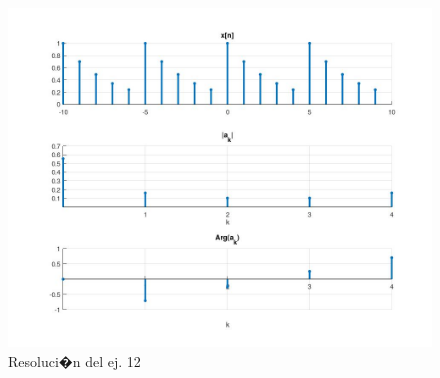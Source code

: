 \documentclass[10pt,a4paper]{article}
\begin{document}
\begin{enumerate}
\begin{enumerate}
	\begin{figure}[h]
		\begin{center}
			\includegraphics[width=16cm]{tp8_ej12.jpg}
		\end{center}
		\caption{Resoluci�n del ej. 12}
		\label{fig:ej_12}
	\end{figure}
	
\end{enumerate}




\end{enumerate}
\end{document}
